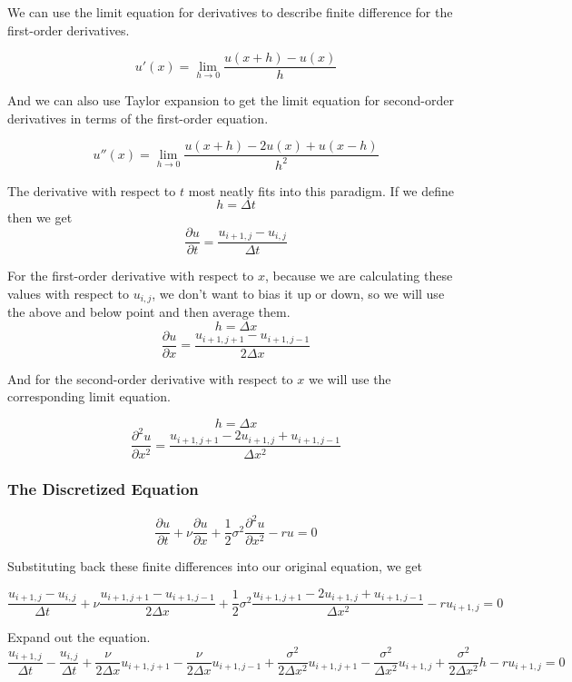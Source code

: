 \documentclass[11pt]{article}
\begin{document}
We can use the limit equation for derivatives to describe finite
difference for the first-order derivatives.

\[u'(x) = \lim_{h \rightarrow 0}  \frac{u(x + h) - u(x)}{h}\]

And we can also use Taylor expansion to get the limit equation for
second-order derivatives in terms of the first-order equation.

\[u''(x) = \lim_{h \rightarrow 0} \frac{u(x+h) - 2u(x) + u(x-h)}{h^2}\]

    The derivative with respect to \(t\) most neatly fits into this
paradigm. If we define \[h = \Delta t\] then we get
\[\frac{\partial u}{\partial t} = \frac{u_{i+1, j} - u_{i, j}}{\Delta t}\]

    For the first-order derivative with respect to \(x\), because we are
calculating these values with respect to \(u_{i, j}\), we don't want to
bias it up or down, so we will use the above and below point and then
average them. \[h = \Delta x\]
\[\frac{\partial u}{\partial x} = \frac{u_{i+1,j+1} - u_{i+1,j-1}}{2\Delta x}\]

    And for the second-order derivative with respect to \(x\) we will use
the corresponding limit equation.

\[h = \Delta x\]
\[\frac{\partial^2 u}{\partial x^2} = \frac{u_{i+1,j+1} - 2u_{i+1,j} + u_{i+1,j-1}}{\Delta x^2}\]

    \subsubsection{The Discretized Equation}\label{the-discretized-equation}

    \[\frac{\partial u}{\partial t} + \nu\frac{\partial u}{\partial x} + \frac{1}{2}\sigma^2 \frac{\partial^2 u}{\partial x^2} - ru = 0\]

    Substituting back these finite differences into our original equation,
we get

\[\frac{u_{i+1, j} - u_{i, j}}{\Delta t} + \nu \frac{u_{i+1,j+1} - u_{i+1,j-1}}{2\Delta x} + \frac{1}{2} \sigma^2 \frac{u_{i+1,j+1} - 2u_{i+1,j} + u_{i+1,j-1}}{\Delta x^2} - r u_{i+1, j} = 0\]

    Expand out the equation.
\[\frac{u_{i+1, j}}{\Delta t} - \frac{u_{i, j}}{\Delta t} + \frac{\nu}{2\Delta x} u_{i+1, j+1} - \frac{\nu}{2\Delta x} u_{i+1, j-1} + \frac{\sigma^2}{2\Delta x^2} u_{i+1, j+1} - \frac{\sigma^2}{\Delta x^2} u_{i+1, j} + \frac{\sigma^2}{2 \Delta x^2} h - ru_{i+1, j} = 0\]
\end{document}
